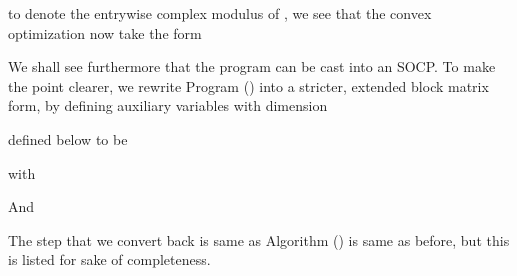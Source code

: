 to denote the entrywise complex modulus of , we see that the convex optimization now take the form

\stopsection

\startsection [title={Second Order Cone Programming}]

We shall see furthermore that the program can be cast into an SOCP.
To make the point clearer, we rewrite Program () into a stricter, extended block matrix form, by defining auxiliary variables with dimension


defined below to be


with


And


The step that we convert  back is same as Algorithm () is same as before, but this is listed for sake of completeness.

